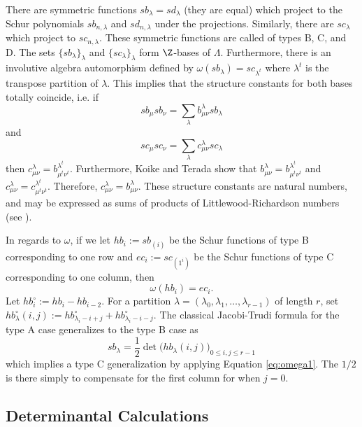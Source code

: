 There are symmetric functions $sb_\lambda=sd_\lambda$ (they are equal) which project to the Schur polynomials $sb_{n,\lambda}$ and $sd_{n, \lambda}$ under the projections. Similarly, there are $sc_\lambda$ which project to $sc_{n, \lambda}$. These symmetric functions are called  of types B, C, and D. The sets $\{sb_\lambda \}_\lambda$ and $\{sc_\lambda \}_\lambda$ form $\Z$-bases of $\Lambda$. Furthermore, there is an involutive algebra automorphism defined by $\omega(sb_\lambda) = sc_{\lambda^t}$ where $\lambda^t$ is the transpose partition of $\lambda$. This implies that the structure constants for both bases totally coincide, i.e. if 
\[
sb_{\mu} sb_{\nu} = \sum_\lambda b_{\mu \nu}^\lambda sb_\lambda
\]
and
\[
sc_{\mu} sc_{\nu} = \sum_\lambda c_{\mu \nu}^{\lambda} sc_{\lambda}
\]
then $c_{\mu \nu}^\lambda = b_{\mu^t \nu^t}^{\lambda^t}$. Furthermore, Koike and Terada show that $b_{\mu \nu}^\lambda = b_{\mu^t \nu^t}^{\lambda^t}$ and $c_{\mu \nu}^\lambda = c_{\mu^t \nu^t}^{\lambda^t}$. Therefore, $c_{\mu \nu}^\lambda = b_{\mu \nu}^\lambda$. These structure constants are natural numbers, and may be expressed as sums of products of Littlewood-Richardson numbers (see \cite{Koi89}).

In regards to $\omega$, if we let $hb_i := sb_{(i)}$ be the Schur functions of type B corresponding to one row and $ec_i := sc_{(1^i)}$ be the Schur functions of type C corresponding to one column, then 
\begin{equation} \label{eq:omega1}
\omega(hb_i) = ec_i.
\end{equation}
Let $hb_i^\circ := hb_i - hb_{i-2}$. For a partition $\lambda=(\lambda_0, \lambda_1, \dots, \lambda_{r-1})$ of length $r$, set $hb_\lambda^\circ(i,j) := hb_{\lambda_i - i + j}^\circ + hb_{\lambda_i - i - j}^\circ$. The classical Jacobi-Trudi formula for the type A case generalizes to the type B case as
\begin{equation} \label{eq:jacobitrudi}
sb_\lambda = \frac{1}{2} \det \big( hb_\lambda(i, j) \big)_{0 \leq i, j \leq r-1}
\end{equation}
which implies a type C generalization by applying Equation \eqref{eq:omega1}. The $1/2$ is there simply to compensate for the first column for when $j=0$. 


\subsection{Determinantal Calculations}

